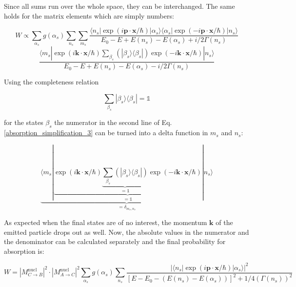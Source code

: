 \documentclass{article}
\begin{document}
Since all sums run over the whole space, they can be interchanged. 
The same holds for the matrix elements which are simply numbers:

\begin{equation}
\label{absorption_simplification_3}
	W \propto \sum_{\alpha_s} g(\alpha_s) \sum_{n_s} \sum_{m_s} \frac{  \langle n_s | \exp{\left( i \mathbf{p} \cdot \mathbf{x} / \hbar \right)} | \alpha_s \rangle \langle \alpha_s | \exp{\left(  - i \mathbf{p} \cdot \mathbf{x} / \hbar \right)} | n_s \rangle  }{E_0 - E + E(n_s) - E(\alpha_s) + i/2 \Gamma(n_s)} 
\end{equation}	
\begin{equation*}
	\frac{ \langle m_s | \exp{\left( i \mathbf{k} \cdot \mathbf{x} / \hbar \right)} \sum_{\beta_s} \left( | \beta_s \rangle \langle \beta_s | \right) \exp{\left( - i \mathbf{k} \cdot \mathbf{x} / \hbar \right)} | n_s \rangle }{E_0 - E + E(n_s) - E(\alpha_s) - i/2 \Gamma(n_s)}
\end{equation*}

Using the completeness relation

\begin{equation}
	\label{completeness_relation_system}
	\sum_{\beta_s} | \beta_s \rangle \langle \beta_s | = \mathbb{1}
\end{equation}

for the states $\beta_s$ the numerator in the second line of Eq. \ref{absorption_simplification_3} can be turned into a delta function in $m_s$ and $n_s$:

\begin{equation}
	\label{absorption_simplification_4}
	\underbrace{\langle m_s | \underbrace{\exp{\left( i \mathbf{k} \cdot \mathbf{x} / \hbar \right)} \underbrace{\sum_{\beta_s} \left( | \beta_s \rangle \langle \beta_s | \right)}_{ = \mathbb{1}} \exp{\left( - i \mathbf{k} \cdot \mathbf{x} / \hbar \right)} }_{ = \mathbb{1}} | n_s \rangle }_{ = \delta_{m_s, n_s}}
\end{equation}

As expected when the final states are of no interest, the momentum $\mathbf{k}$ of the emitted particle drops out as well. 
Now, the absolute values in the numerator and the denominator can be calculated separately and the final probability for absorption is:

\begin{equation}
\label{absorption_general_summed}
	W = \left| M^{\mathrm{nucl}}_{C \to B} \right|^2 \cdot \left| M^{\mathrm{nucl}}_{A \to C} \right|^2 \sum_{\alpha_s} g(\alpha_s) \sum_{n_s} \frac{ \left| \langle n_s | \exp{\left( i \mathbf{p} \cdot \mathbf{x} / \hbar \right)} | \alpha_s \rangle \right|^2  }{\left[ E - E_0 - \left( E(n_s) - E(\alpha_s) \right) \right]^2 + 1/4 \left( \Gamma(n_s) \right)^2 }
\end{equation}
\end{document}

